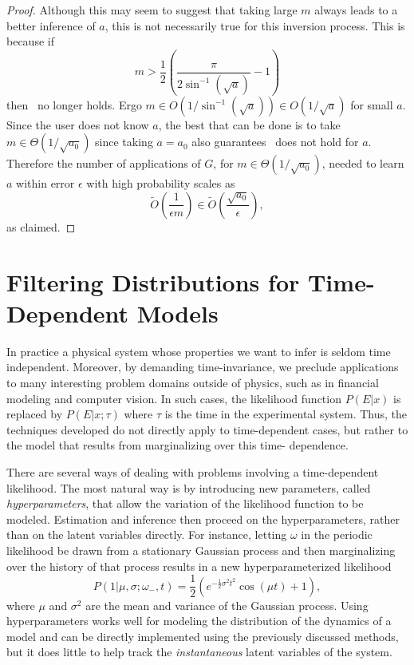 \documentclass[aps,amsmath,onecolumn,amssymb]{revtex4}
\begin{document}
\begin{proof}
Although this may seem to suggest that taking large $m$ always leads to a better inference of $a$, this is not necessarily true for this inversion process.  This is because if 
\begin{equation}
m > \frac{1}{2}\left(\frac{\pi}{2\sin^{-1}(\sqrt{a})}-1\right)\label{eq:mvalid}
\end{equation} then~ no longer holds.  Ergo $m\in O(1/\sin^{-1}(\sqrt{a}))\in O(1/\sqrt{a})$ for small $a$.  Since the user does not know $a$, the best that can be done is to take $m\in \Theta(1/\sqrt{a_0})$ since taking $a=a_0$ also guarantees~ does not hold for $a$.  Therefore the number of applications of $G$, for $m\in \Theta(1/\sqrt{a_0})$, needed to learn $a$ within error $\epsilon$ with high probability scales as
\begin{equation}
\tilde O\left(\frac{1}{\epsilon m} \right) \in \tilde O\left(\frac{\sqrt{a_0}}{\epsilon} \right),
\end{equation}
as claimed.
\end{proof}

\section{Filtering Distributions for Time-Dependent Models}
\label{sec:time-dep}

In practice a physical system whose properties we want to infer is seldom time
independent. Moreover, by demanding time-invariance, we preclude applications
to many interesting problem domains outside of physics, such as in financial
modeling and computer vision. In such cases, the likelihood function $P(E|x)$
is replaced by $P(E|x;\tau)$ where $\tau$ is the time in the experimental
system. Thus, the techniques developed do not directly apply to time-dependent
cases, but rather to the model that results from marginalizing over this time-
dependence.

There are several ways of dealing with problems involving a time-dependent
likelihood. The most natural way is by introducing new parameters, called
\emph{hyperparameters}, that allow the variation of the likelihood function to
be modeled. Estimation and inference then proceed on the hyperparameters,
rather than on the latent variables directly. For instance, letting $\omega$
in the periodic likelihood 
 be drawn from a stationary Gaussian
process and then marginalizing over the history of that process results in a
new hyperparameterized likelihood
\begin{equation}
    P(1 | \mu, \sigma; \omega_-, t) = \frac{1}{2} \left(e^{-\frac{1}{2} \sigma ^2 t^2} \cos (\mu  t)+1\right),
\end{equation}
where $\mu$ and $\sigma^2$ are the mean and variance of the Gaussian process.
Using hyperparameters works well for modeling the distribution of the
dynamics of a model and can be directly implemented using the previously
discussed methods, but it does little to help track the \emph{instantaneous}
latent variables of the system.
\end{document}
